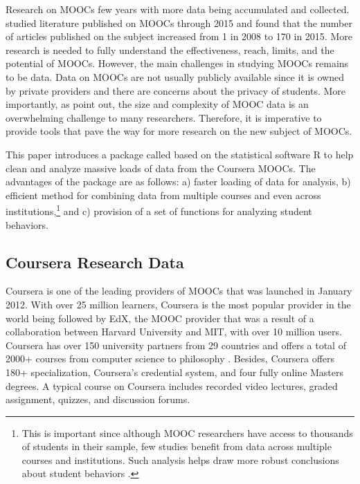 Research on MOOCs few years with more data being accumulated and
collected. \cite{bozkurt2017trends} studied literature published on
MOOCs through 2015 and found that the number of articles published on
the subject increased from 1 in 2008 to 170 in 2015. More research is
needed to fully understand the effectiveness, reach, limits, and the
potential of MOOCs. However, the main challenges in studying MOOCs
remains to be data. Data on MOOCs are not usually publicly available
since it is owned by private providers and there are concerns about the
privacy of students. More importantly, as \cite{lopez2017google} point
out, the size and complexity of MOOC data is an overwhelming challenge
to many researchers. Therefore, it is imperative to provide tools that
pave the way for more research on the new subject of MOOCs.

This paper introduces a package called  \citep{crsra} based
on the statistical software R to help clean and analyze massive loads of
data from the Coursera MOOCs. The advantages of the package are as
follows: a) faster loading of data for analysis, b) efficient method for
combining data from multiple courses and even across
institutions,\footnote{This is important since although MOOC researchers have access to thousands of students in their sample, few studies benefit from data across multiple courses and institutions. Such analysis helps draw more robust conclusions about student behaviors \citep{reich2015rebooting}.}
and c) provision of a set of functions for analyzing student behaviors.

\subsection{Coursera Research Data}\label{coursera-research-data}

Coursera is one of the leading providers of MOOCs that was launched in
January 2012. With over 25 million learners, Coursera is the most
popular provider in the world being followed by EdX, the MOOC provider
that was a result of a collaboration between Harvard University and MIT,
with over 10 million users. Coursera has over 150 university partners
from 29 countries and offers a total of 2000+ courses from computer
science to philosophy \citep{coursera}. Besides, Coursera offers 180+
specialization, Coursera's credential system, and four fully online
Masters degrees. A typical course on Coursera includes recorded video
lectures, graded assignment, quizzes, and discussion forums.

